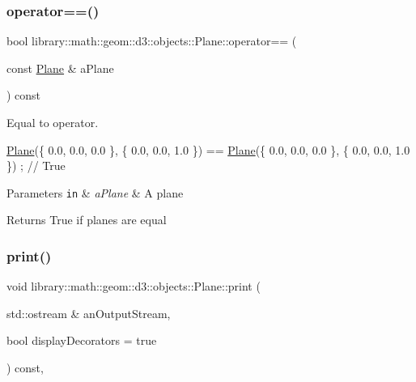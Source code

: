 \subsubsection{\texorpdfstring{operator==()}{operator==()}}
{\footnotesize\ttfamily bool library\+::math\+::geom\+::d3\+::objects\+::\+Plane\+::operator== (\begin{DoxyParamCaption}\item[{const \hyperlink{classlibrary_1_1math_1_1geom_1_1d3_1_1objects_1_1_plane}{Plane} \&}]{a\+Plane }\end{DoxyParamCaption}) const}



Equal to operator. 


\begin{DoxyCode}
\hyperlink{classlibrary_1_1math_1_1geom_1_1d3_1_1objects_1_1_plane_a81fe78a983e2cb6ee6ad9bfabd22c3a4}{Plane}(\{ 0.0, 0.0, 0.0 \}, \{ 0.0, 0.0, 1.0 \}) == \hyperlink{classlibrary_1_1math_1_1geom_1_1d3_1_1objects_1_1_plane_a81fe78a983e2cb6ee6ad9bfabd22c3a4}{Plane}(\{ 0.0, 0.0, 0.0 \}, \{ 0.0, 0.0, 1.0 \}) ; \textcolor{comment}{//
       True}
\end{DoxyCode}



\begin{DoxyParams}[1]{Parameters}
\mbox{\tt in}  & {\em a\+Plane} & A plane \\
\hline
\end{DoxyParams}
\begin{DoxyReturn}{Returns}
True if planes are equal 
\end{DoxyReturn}
\mbox{\label{classlibrary_1_1math_1_1geom_1_1d3_1_1objects_1_1_plane_a2e43e82344b57898606f5c13ffc9dcc9}} 
\subsubsection{\texorpdfstring{print()}{print()}}
{\footnotesize\ttfamily void library\+::math\+::geom\+::d3\+::objects\+::\+Plane\+::print (\begin{DoxyParamCaption}\item[{std\+::ostream \&}]{an\+Output\+Stream,  }\item[{bool}]{display\+Decorators = {\ttfamily true} }\end{DoxyParamCaption}) const\hspace{0.3cm}{\ttfamily [override]}, {\ttfamily [virtual]}}



